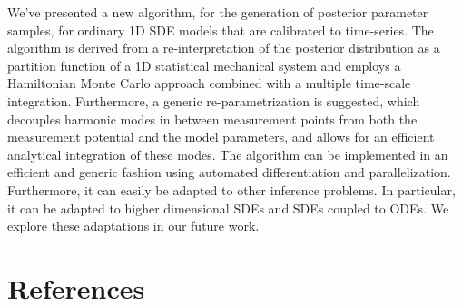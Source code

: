 \documentclass[12pt,a4paper,final]{iopart}
\begin{document}
We've presented a new algorithm, for the generation of posterior parameter samples, for ordinary 1D SDE models that are calibrated to time-series.
The algorithm is derived from a re-interpretation of the posterior distribution as a partition function of a 1D statistical mechanical system and employs a Hamiltonian Monte Carlo approach combined with a multiple time-scale integration.
Furthermore, a generic re-parametrization is suggested, which decouples harmonic modes in between measurement points from both the measurement potential and the model parameters, and allows for an efficient analytical integration of these modes.
The algorithm can be implemented in an efficient and generic fashion using automated differentiation and parallelization.
Furthermore, it can easily be adapted to other inference problems.
In particular, it can be adapted to higher dimensional SDEs and SDEs coupled to ODEs.
We explore these adaptations in our future work.

\section*{References}


\end{document}

